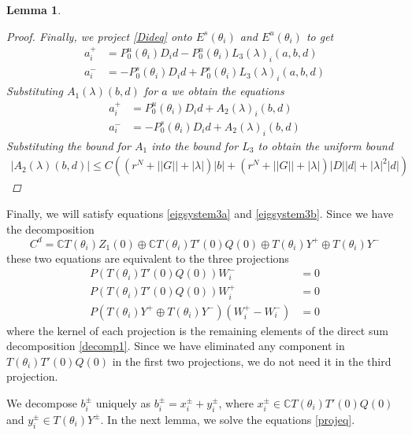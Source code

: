 \documentclass[12pt]{article}
\def\C{{\mathbb C}}
\newtheorem{lemma}{Lemma}
\begin{document}
\begin{lemma}
\begin{proof}
Finally, we project \eqref{Dideq} onto $E^s(\theta_i)$ and $E^u(\theta_i)$ to get
\begin{align*}
a_i^+ &= P_0^u(\theta_i) D_i d - P_0^u(\theta_i) L_3(\lambda)_i(a,b,d) \\
a_i^- &= -P_0^s(\theta_i) D_i d + P_0^s(\theta_i) L_3(\lambda)_i(a,b,d)
\end{align*}
Substituting $A_1(\lambda)(b,d)$ for $a$ we obtain the equations
\begin{align*}
a_i^+ &= P_0^u(\theta_i) D_i d + A_2(\lambda)_i(b,d) \\
a_i^- &= -P_0^s(\theta_i) D_i d + A_2(\lambda)_i(b,d)
\end{align*}
Substituting the bound for $A_1$ into the bound for $L_3$ to obtain the uniform bound
\begin{align*}
|A_2(\lambda)(b,d)| \leq 
C\left( (r^N + ||G|| + |\lambda| )|b| + (r^N + ||G|| + |\lambda|)|D||d| + |\lambda|^2 |d|  \right)
\end{align*}
\end{proof}
\end{lemma}

Finally, we will satisfy equations \eqref{eigsystem3a} and \eqref{eigsystem3b}. Since we have the decomposition
\begin{equation}\label{decomp1}
C^d = \C T(\theta_i) Z_1(0) \oplus \C T(\theta_i) T'(0)Q(0) \oplus T(\theta_i) Y^+ \oplus T(\theta_i) Y^-
\end{equation}
these two equations are equivalent to the three projections
\begin{equation}\label{projeq}
\begin{aligned}
P(T(\theta_i) T'(0)Q(0)) W_i^- &= 0 \\
P(T(\theta_i) T'(0)Q(0)) W_i^+ &= 0 \\
P(T(\theta_i) Y^+ \oplus T(\theta_i) Y^-) (W_i^+ - W_i^-) &= 0
\end{aligned}
\end{equation}
where the kernel of each projection is the remaining elements of the direct sum decomposition \eqref{decomp1}. Since we have eliminated any component in $T(\theta_i) T'(0)Q(0)$ in the first two projections, we do not need it in the third projection.

We decompose $b_i^\pm$ uniquely as $b_i^\pm = x_i^\pm + y_i^\pm$, where $x_i^\pm \in \C T(\theta_i) T'(0)Q(0)$ and $y_i^\pm \in T(\theta_i) Y^\pm$. In the next lemma, we solve the equations \eqref{projeq}.
\end{document}
